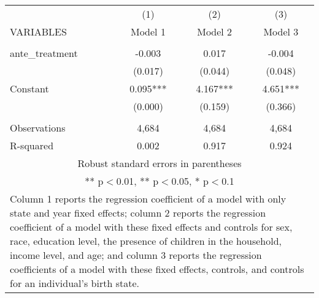 \begin{tabular}{lccc}
\hline
 & (1) & (2) & (3) \\
VARIABLES & Model 1 & Model 2 & Model 3 \\ \hline
 &  &  &  \\
ante\_treatment & -0.003 & 0.017 & -0.004 \\
 & (0.017) & (0.044) & (0.048) \\
Constant & 0.095*** & 4.167*** & 4.651*** \\
 & (0.000) & (0.159) & (0.366) \\
 &  &  &  \\
Observations & 4,684 & 4,684 & 4,684 \\
 R-squared & 0.002 & 0.917 & 0.924 \\ \hline
\multicolumn{4}{c}{\small Robust standard errors in parentheses} \\
\multicolumn{4}{c}{\small *** p$<$0.01, ** p$<$0.05, * p$<$0.1} \\
\multicolumn{4}{p{0.8\linewidth}}{\small Column 1 reports the
regression coefficient of a model with only state and year fixed effects; column 2 reports the
regression coefficient of a model with these fixed effects and controls for sex, race, education
level, the presence of children in the household, income level, and age; and column 3 reports
the regression coefficients of a model with these fixed effects, controls, and controls for an
individual’s birth state.} \\
\end{tabular}
